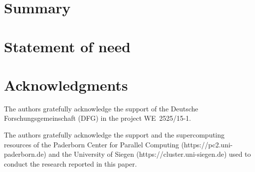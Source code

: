 \documentclass{juliacon}
\begin{document}


\maketitle

\section{Summary}

\cite{bezanson2017julia}

\section{Statement of need}

\section{Acknowledgments}
The authors gratefully acknowledge the support of the Deutsche Forschungsgemeinschaft (DFG) in the project \mbox{WE~2525/15-1}.

The authors gratefully acknowledge the support and the supercomputing resources of the Paderborn Center for Parallel Computing (https://pc2.uni-paderborn.de) and the University of Siegen (https://cluster.uni-siegen.de) used to conduct the research reported in this paper.



\end{document}
